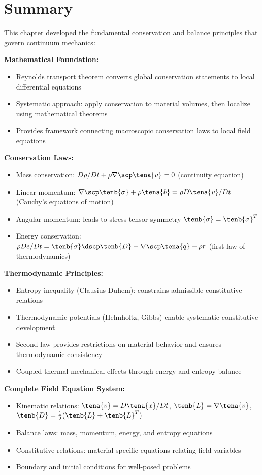 \section{Summary}

\begin{subox}[Summary]
This chapter developed the fundamental conservation and balance principles that govern continuum mechanics:

\textbf{Mathematical Foundation:}
\begin{itemize}
\item Reynolds transport theorem converts global conservation statements to local differential equations
\item Systematic approach: apply conservation to material volumes, then localize using mathematical theorems
\item Provides framework connecting macroscopic conservation laws to local field equations
\end{itemize}

\textbf{Conservation Laws:}
\begin{itemize}
\item Mass conservation: $D\rho/Dt + \rho \nabla \scp \tena{v} = 0$ (continuity equation)
\item Linear momentum: $\nabla \scp \tenb{\sigma} + \rho \tena{b} = \rho D\tena{v}/Dt$ (Cauchy's equations of motion)
\item Angular momentum: leads to stress tensor symmetry $\tenb{\sigma} = \tenb{\sigma}^T$
\item Energy conservation: $\rho De/Dt = \tenb{\sigma} \dscp \tenb{D} - \nabla \scp \tena{q} + \rho r$ (first law of thermodynamics)
\end{itemize}

\textbf{Thermodynamic Principles:}
\begin{itemize}
\item Entropy inequality (Clausius-Duhem): constrains admissible constitutive relations
\item Thermodynamic potentials (Helmholtz, Gibbs) enable systematic constitutive development
\item Second law provides restrictions on material behavior and ensures thermodynamic consistency
\item Coupled thermal-mechanical effects through energy and entropy balance
\end{itemize}

\textbf{Complete Field Equation System:}
\begin{itemize}
\item Kinematic relations: $\tena{v} = D\tena{x}/Dt$, $\tenb{L} = \nabla \tena{v}$, $\tenb{D} = \frac{1}{2}(\tenb{L} + \tenb{L}^T)$
\item Balance laws: mass, momentum, energy, and entropy equations
\item Constitutive relations: material-specific equations relating field variables
\item Boundary and initial conditions for well-posed problems
\end{itemize}


\end{subox}
